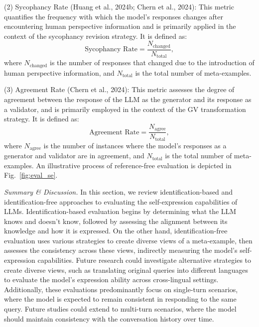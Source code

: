 (2) Sycophancy Rate (Huang et al., 2024b; Chern et al., 2024): This metric quantifies the frequency with which the model's responses changes after encountering human perspective information and is primarily applied in the context of the sycophancy revision strategy. It is defined as:
\begin{equation}
\text{Sycophancy Rate} = \frac{N_{\text{changed}}}{N_{\text{total}}},
\end{equation}
where $N_{\text{changed}}$ is the number of responses that changed due to the introduction of human perspective information, and $N_{\text{total}}$ is the total number of meta-examples.

(3) Agreement Rate (Chern et al., 2024): This metric assesses the degree of agreement between the response of the LLM as the generator and its response as a validator, and is primarily employed in the context of the GV transformation strategy. It is defined as:
\begin{equation}
\text{Agreement Rate} = \frac{N_{\text{agree}}}{N_{\text{total}}},
\end{equation}
where $N_{\text{agree}}$ is the number of instances where the model's responses as a generator and validator are in agreement, and $N_{\text{total}}$ is the total number of meta-examples. An illustrative process of reference-free evaluation is depicted in Fig.~\ref{fig:eval_se}.

\emph{Summary \& Discussion.} In this section, we review identification-based and identification-free approaches to evaluating the self-expression capabilities of LLMs. Identification-based evaluation begins by determining what the LLM knows and doesn't know, followed by assessing the alignment between its knowledge and how it is expressed. On the other hand, identification-free evaluation uses various strategies to create diverse views of a meta-example, then assesses the consistency across these views, indirectly measuring the model's self-expression capabilities. Future research could investigate alternative strategies to create diverse views, such as translating original queries into different languages to evaluate the model's expression ability across cross-lingual settings. Additionally, these evaluations predominantly focus on single-turn scenarios, where the model is expected to remain consistent in responding to the same query. Future studies could extend to multi-turn scenarios, where the model should maintain consistency with the conversation history over time.
